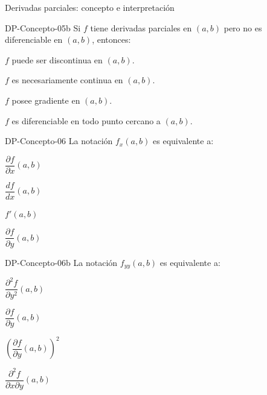 \documentclass[a4,11pt]{aleph-notas}
\begin{document}
\begin{quiz}{Derivadas parciales: concepto e interpretación}
\begin{multi}[]%
    {DP-Concepto-05b}
    Si $f$ tiene derivadas parciales en $(a,b)$ pero no es diferenciable en $(a,b)$, entonces:
    \item* $f$ puede ser discontinua en $(a,b)$.
    \item $f$ es necesariamente continua en $(a,b)$.
    \item $f$ posee gradiente en $(a,b)$.
    \item $f$ es diferenciable en todo punto cercano a $(a,b)$.
\end{multi}

\begin{multi}[]%
    {DP-Concepto-06}
    La notación $f_x(a,b)$ es equivalente a:
    \item* $\dfrac{\partial f}{\partial x}(a,b)$
    \item $\dfrac{df}{dx}(a,b)$
    \item $f'(a,b)$
    \item $\dfrac{\partial f}{\partial y}(a,b)$
\end{multi}

\begin{multi}[]%
    {DP-Concepto-06b}
    La notación $f_{yy}(a,b)$ es equivalente a:
    \item* $\dfrac{\partial^2 f}{\partial y^2}(a,b)$
    \item $\dfrac{\partial f}{\partial y}(a,b)$
    \item $\left(\dfrac{\partial f}{\partial y}(a,b)\right)^2$
    \item $\dfrac{\partial^2 f}{\partial x \partial y}(a,b)$
\end{multi}

\end{quiz}
\end{document}
